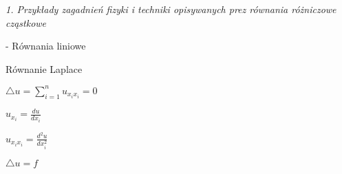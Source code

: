 \textit{1. Przykłady zagadnień fizyki i techniki opisywanych prez równania różniczowe cząstkowe}


- Równania liniowe

Równanie Laplace

$ \bigtriangleup u = \sum_{i=1}^{n} u_{x_ix_i} =0$

$ u_{x_i} = \frac{du}{dx_i}$

$ u_{x_i x_i} = \frac{d^2u}{dx_i^2}$

$ \bigtriangleup u =f$